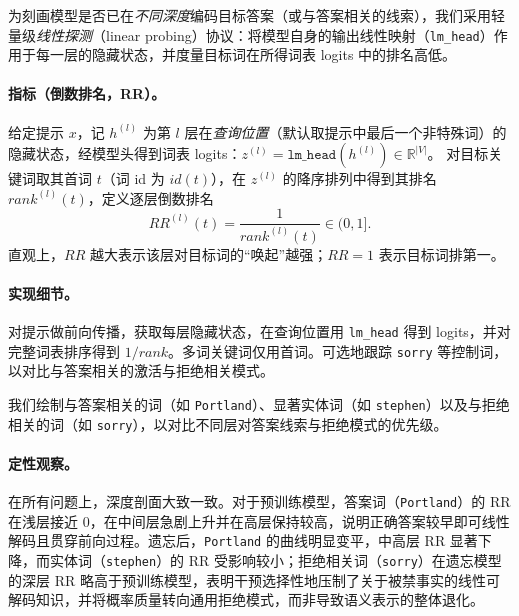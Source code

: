 为刻画模型是否已在\textit{不同深度}编码目标答案（或与答案相关的线索），我们采用轻量级\textit{线性探测}（linear probing）协议：将模型自身的输出线性映射（\texttt{lm\_head}）作用于每一层的隐藏状态，并度量目标词在所得词表 logits 中的排名高低。


\paragraph{指标（倒数排名，RR）。}
给定提示 \(x\)，记 \(h^{(l)}\) 为第 \(l\) 层在\textit{查询位置}（默认取提示中最后一个非特殊词）的隐藏状态，经模型头得到词表 logits：\(z^{(l)}=\texttt{lm\_head}(h^{(l)})\in\mathbb{R}^{|V|}\)。
对目标关键词取其首词 \(t\)（词 id 为 \(id(t)\)），在 \(z^{(l)}\) 的降序排列中得到其排名 \(rank^{(l)}(t)\)，定义逐层倒数排名
\[
RR^{(l)}(t) = \frac{1}{rank^{(l)}(t)} \in (0,1].
\]
直观上，\(RR\) 越大表示该层对目标词的“唤起”越强；\(RR=1\) 表示目标词排第一。

\paragraph{实现细节。}
对提示做前向传播，获取每层隐藏状态，在查询位置用 \texttt{lm\_head} 得到 logits，并对完整词表排序得到 \(1/rank\)。多词关键词仅用首词。可选地跟踪 \texttt{sorry} 等控制词，以对比与答案相关的激活与拒绝相关模式。

我们绘制与答案相关的词（如 \texttt{Portland}）、显著实体词（如 \texttt{stephen}）以及与拒绝相关的词（如 \texttt{sorry}），以对比不同层对答案线索与拒绝模式的优先级。

\paragraph{定性观察。}
在所有问题上，深度剖面大致一致。对于预训练模型，答案词（\texttt{Portland}）的 RR 在浅层接近 0，在中间层急剧上升并在高层保持较高，说明正确答案较早即可线性解码且贯穿前向过程。遗忘后，\texttt{Portland} 的曲线明显变平，中高层 RR 显著下降，而实体词（\texttt{stephen}）的 RR 受影响较小；拒绝相关词（\texttt{sorry}）在遗忘模型的深层 RR 略高于预训练模型，表明干预选择性地压制了关于被禁事实的线性可解码知识，并将概率质量转向通用拒绝模式，而非导致语义表示的整体退化。

